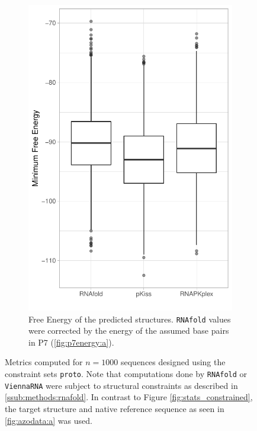 \documentclass[../../master.tex]{subfiles}
\begin{document}
\begin{figure}[!ht]
\begin{subfigure}[t]{0.27\textwidth}
		\includegraphics[width=\textwidth]{pic/results/designs/boxplots/proto-mfe-boxplot.pdf}
		\caption{Free Energy of the predicted structures.  \texttt{RNAfold} values were corrected by the energy of the assumed base pairs in P7 (\autoref{fig:p7energy:a}).
		}\label{fig:stats_proto:d}
	\end{subfigure}
	\caption[Properties of Initial Constrained Designs ]{
		Metrics computed for $n = 1000$ sequences designed using the constraint sets \texttt{proto}. Note that computations done by \texttt{RNAfold} or \texttt{ViennaRNA} were subject to structural constraints as described in \autoref{ssub:methods:rnafold}.
		In contrast to Figure \ref{fig:stats_constrained}, the target structure and native reference sequence as seen in \autoref{fig:azodata:a} was used.
	}\label{fig:stats_proto}
\end{figure}
\end{document}
